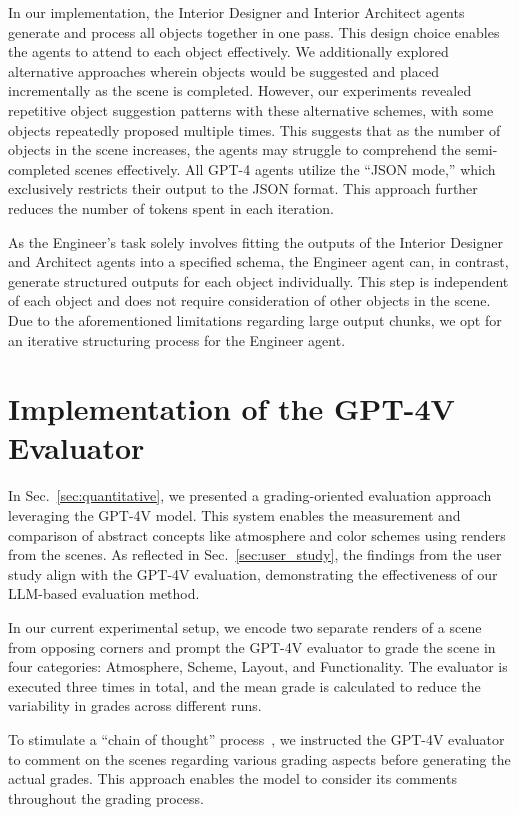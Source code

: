 In our implementation, the Interior Designer and Interior Architect agents generate and process all objects together in one pass. This design choice enables the agents to attend to each object effectively. We additionally explored alternative approaches wherein objects would be suggested and placed incrementally as the scene is completed. However, our experiments revealed repetitive object suggestion patterns with these alternative schemes, with some objects repeatedly proposed multiple times. This suggests that as the number of objects in the scene increases, the agents may struggle to comprehend the semi-completed scenes effectively. All GPT-4 agents utilize the ``JSON mode,'' which exclusively restricts their output to the JSON format. This approach further reduces the number of tokens spent in each iteration.

As the Engineer's task solely involves fitting the outputs of the Interior Designer and Architect agents into a specified schema, the Engineer agent can, in contrast, generate structured outputs for each object individually. This step is independent of each object and does not require consideration of other objects in the scene. Due to the aforementioned limitations regarding large output chunks, we opt for an iterative structuring process for the Engineer agent.

\section{Implementation of the GPT-4V Evaluator}
In Sec.~\ref{sec:quantitative}, we presented a grading-oriented evaluation approach leveraging the GPT-4V model. This system enables the measurement and comparison of abstract concepts like atmosphere and color schemes using renders from the scenes. As reflected in Sec.~\ref{sec:user_study}, the findings from the user study align with the GPT-4V evaluation, demonstrating the effectiveness of our LLM-based evaluation method. 

In our current experimental setup, we encode two separate renders of a scene from opposing corners and prompt the GPT-4V evaluator to grade the scene in four categories: Atmosphere, Scheme, Layout, and Functionality. The evaluator is executed three times in total, and the mean grade is calculated to reduce the variability in grades across different runs. 

To stimulate a ``chain of thought'' process~\cite{wei2022chain}, we instructed the GPT-4V evaluator to comment on the scenes regarding various grading aspects before generating the actual grades. This approach enables the model to consider its comments throughout the grading process.

